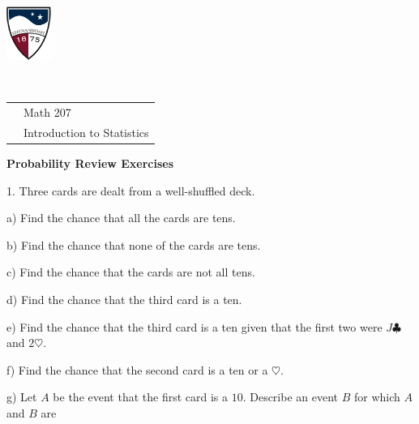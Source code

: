 \documentclass[10pt]{article}
\begin{document}
\pagestyle{empty}
\lstset{language=R, showspaces=false, showstringspaces=false}

\href{http://www.su.edu}{\includegraphics[height=1.75cm]{sulogo.eps}}
\vspace{-1.79cm}

{{\ }\hfill\small
\begin{tabular}{cl}
& Math 207\\
& Introduction to Statistics\\
\end{tabular}
}
\setlength{\baselineskip}{1.05\baselineskip}

\begin{center}
\textbf{\large  Probability Review Exercises}
\end{center}

1. Three cards are dealt from a well-shuffled deck.
\smallskip

\hspace{20pt} a) Find the chance that all the cards are tens.
\vspace{0.75in}

\hspace{20pt} b) Find the chance that none of the cards are tens.
\vspace{0.75in}

\hspace{20pt} c) Find the chance that the cards are not all tens.
\vspace{0.75in}

\hspace{20pt} d) Find the chance that the third card is a ten.
\vspace{0.75in}

\hspace{20pt} e) Find the chance that the third card is a ten given that the first two 
were $J\clubsuit$ and $2\heartsuit$.
\vspace{0.75in}

\hspace{20pt} f) Find the chance that the second card is a ten or a $\heartsuit$.
\vspace{0.75in}

\hspace{20pt} g) Let $A$ be the event that the first card is a $10$.
Describe an event $B$ for which $A$ and $B$ are\vspace{-3pt}
\end{document}
